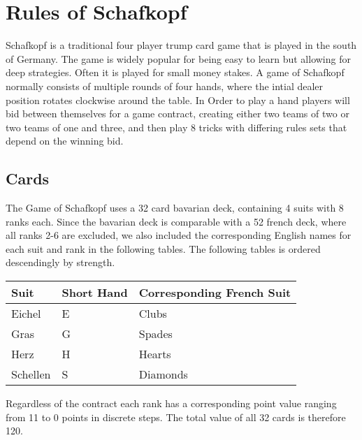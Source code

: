 \chapter{Rules of Schafkopf}
Schafkopf is a traditional four player trump card game that is played in the south of Germany.
The game is widely popular for being easy to learn but allowing for deep strategies.
Often it is played for small money stakes.
A game of Schafkopf normally consists of multiple rounds of four hands, where the intial dealer position rotates
clockwise around the table.
In Order to play a hand players will bid between themselves for a game contract, creating either two teams of two or
two teams of one and three, and then play 8 tricks with differing rules sets that depend on the winning bid.


\section{Cards}\label{sec:cards}
The Game of Schafkopf uses a 32 card bavarian deck, containing 4 suits with 8 ranks each.
Since the bavarian deck is comparable with a 52 french deck, where all ranks 2-6 are excluded, we also included the
corresponding English names for each suit and rank in the following tables.
The following tables is ordered descendingly by strength.
\begin{table}[]
    \begin{tabular}{lll}
        \toprule
        Suit     & Short Hand & Corresponding French Suit \\
        \midrule
        Eichel   & E          & Clubs                     \\
        Gras     & G          & Spades                    \\
        Herz     & H          & Hearts                    \\
        Schellen & S          & Diamonds                  \\
        \bottomrule
    \end{tabular}\label{tab:table2}
\end{table}
Regardless of the contract each rank has a corresponding point value ranging from 11 to 0 points in discrete steps.
The total value of all 32 cards is therefore 120.
